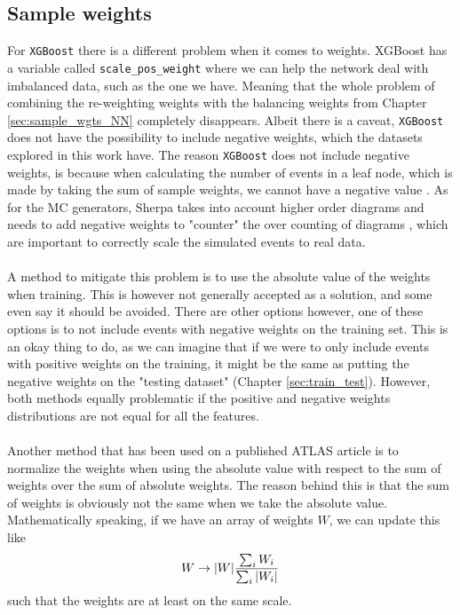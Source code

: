 \documentclass[12pt, a4paper]{book}
\begin{document}
\subsection{Sample weights}\label{sec:bdt_wgts}
For \verb|XGBoost| there is a different problem when it comes to weights. XGBoost has a variable called \verb|scale_pos_weight| where we can help the network deal with imbalanced data, such as the one we have. 
Meaning that the whole problem of combining the re-weighting weights with the balancing weights from Chapter \ref{sec:sample_wgts_NN} completely disappears. Albeit there is a caveat, \verb|XGBoost| does not have the possibility to include negative weights, which the datasets explored in this work have. The reason \verb|XGBoost| 
does not include negative weights, is because when calculating the number of events in a leaf node, which is made by taking the sum of sample weights, we cannot have a negative value \cite{neg_wgt_xbg1, neg_wgt_xbg2}.
As for the MC generators, Sherpa \cite{Sherpa} takes into account higher order diagrams and needs to add negative weights to "counter" the over counting of diagrams \cite{Negative_Weights_article}, which are important to correctly scale the simulated events to real data.\\
\\A method to mitigate this problem is to use the absolute value of the weights when training. This is however not generally accepted as a solution, and some even say it should be avoided. There are other options however, one of these options is to not include events with negative weights on the training set. 
This is an okay thing to do, as we can imagine that if we were to only include events with positive weights on the training, it might be the same as putting the negative weights on the "testing dataset" (Chapter \ref{sec:train_test}). 
However, both methods equally problematic if the positive and negative weights distributions are not equal for all the features.\\
\\Another method that has been used on a published ATLAS article \cite{Abbott:2714377} is to normalize the weights when using the absolute value with respect to the sum of weights over the sum of absolute weights. The reason behind this is that the sum of weights is obviously not the same when we take the absolute value. 
Mathematically speaking, if we have an array of weights $W$, we can update this like
\begin{equation}\label{eq:ATLAS_wgt}
   W \rightarrow \abs{W}\frac{\sum_i W_i}{\sum_i\abs{W_i}}
\end{equation}
such that the weights are at least on the same scale. 
\end{document}
